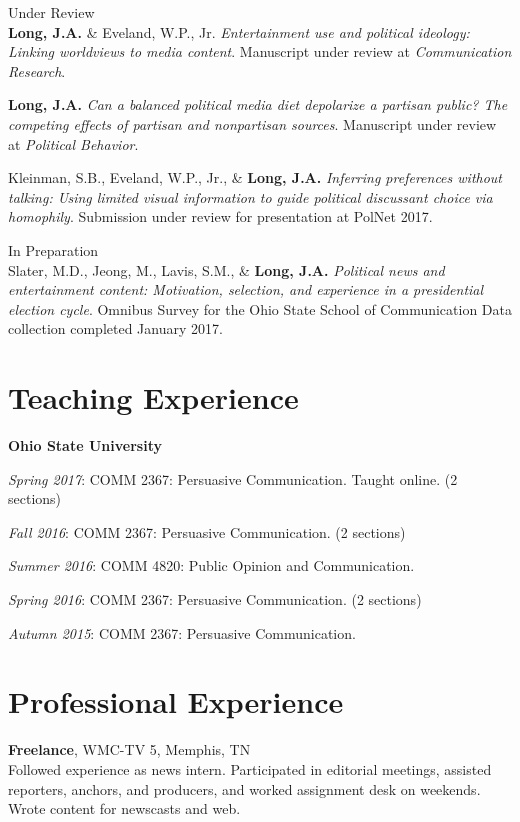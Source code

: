 \documentclass[margin,line]{res}
\begin{document}
\begin{resume}
{\sc Under Review}\\
\textbf{Long, J.A.} \& Eveland, W.P., Jr. \emph{Entertainment use and political ideology: Linking worldviews to media content}. Manuscript under review at \emph{Communication Research}.

\textbf{Long, J.A.} \emph{Can a balanced political media diet depolarize a partisan public? The competing effects of partisan and nonpartisan sources}. Manuscript under review at \emph{Political Behavior}.

Kleinman, S.B., Eveland, W.P., Jr., \& \textbf{Long, J.A.} \emph{Inferring preferences without talking: Using limited visual information to guide political discussant choice via homophily}. Submission under review for presentation at PolNet 2017.

{\sc In Preparation}\\
Slater, M.D., Jeong, M., Lavis, S.M., \& {\bf Long, J.A.} \emph{Political news and entertainment content: Motivation, selection, and experience in a presidential election cycle}. Omnibus Survey for the Ohio State School of Communication Data collection completed January 2017. 



\section{\sc Teaching Experience}
{\bf Ohio State University}

\vspace*{-2.5mm}
\emph{Spring 2017}: COMM 2367: Persuasive Communication. Taught online. (2 sections)

\vspace*{-2.5mm}
\emph{Fall 2016}: COMM 2367: Persuasive Communication. (2 sections)

\vspace*{-2.5mm}
\emph{Summer 2016}: COMM 4820: Public Opinion and Communication.

\vspace*{-2.5mm}
\emph{Spring 2016}: COMM 2367: Persuasive Communication. (2 sections)

\vspace*{-2.5mm}
\emph{Autumn 2015}: COMM 2367: Persuasive Communication.

\section{\sc Professional Experience}
{\bf Freelance}, WMC-TV 5, Memphis, TN\\
Followed experience as news intern. Participated in editorial meetings, assisted reporters, anchors, and producers, and worked assignment desk on weekends. Wrote content for newscasts and web.


\end{resume}
\end{document}
